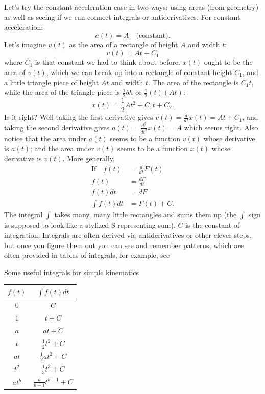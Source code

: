 \documentclass{tufte-handout}
\begin{document}
Let's try the constant acceleration case in two ways: using areas (from geometry) as well as seeing if we can connect integrals or antiderivatives. For constant acceleration:
\begin{equation}
a(t) = A\quad\text{(constant)}.
\end{equation}
Let's imagine $v(t)$ as the area of a rectangle of height $A$ and width $t$:
\begin{equation}
v(t) = A t + C_1
\end{equation}
where $C_1$ is that constant we had to think about before. $x(t)$ ought to be the area of $v(t)$, which we can break up into a rectangle of constant height $C_1$, and a little triangle piece of height $A t$ and width $t$. The area of the rectangle is $C_1 t$, while the area of the triangle piece is $\frac{1}{2} b h$ or $\frac{1}{2} (t) (At)$:
\begin{equation}
x(t) = \frac{1}{2} A t^2 + C_1 t + C_2. 
\end{equation}
Is it right? Well taking the first derivative gives $v(t) = \frac{d}{dt}x(t) = A t + C_1$, and taking the second derivative gives $a(t) = \frac{d^2}{dt^2} x(t) = A$ which seems right. Also notice that the area under $a(t)$ seems to be a function $v(t)$ whose derivative is $a(t)$; and the area under $v(t)$ seems to be a function $x(t)$ whose derivative is $v(t)$. More generally,
\begin{align}
\text{If}\quad f(t) &= \frac{d}{dt} F(t) \\
f(t) &= \frac{dF}{dt} \\
f(t) dt &= dF \\
\int f(t) dt &= F(t) + C.
\end{align}
The integral $\int$ takes many, many little rectangles and sums them up (the $\int$ sign is supposed to look like a stylized S representing sum). $C$ is the constant of integration.  Integrals are often derived via antiderivatives or other clever steps, but once you figure them out you can see and remember patterns, which are often provided in tables of integrals, for example, see 
\begin{margintable}
\caption{Some useful integrals for simple kinematics}
\label{tab:integrals}
\begin{center}
\small
\begin{tabular}{cc}
\toprule
$f(t)$ & $\int f(t) dt$ \\
\midrule
$0$ & $C$ \\
$1$ & $t + C$ \\
$a$ & $at + C$ \\
$t$ & $\frac{1}{2} t^2 + C$ \\
$at$ & $\frac{1}{2} at^2 + C$ \\
$t^2$ & $\frac{1}{3} t^3 + C$ \\
$a t^b$ & $\frac{a}{b+1} t^{b+1} + C$ \\
\bottomrule
\end{tabular}
\end{center}
\end{margintable}
\end{document}
